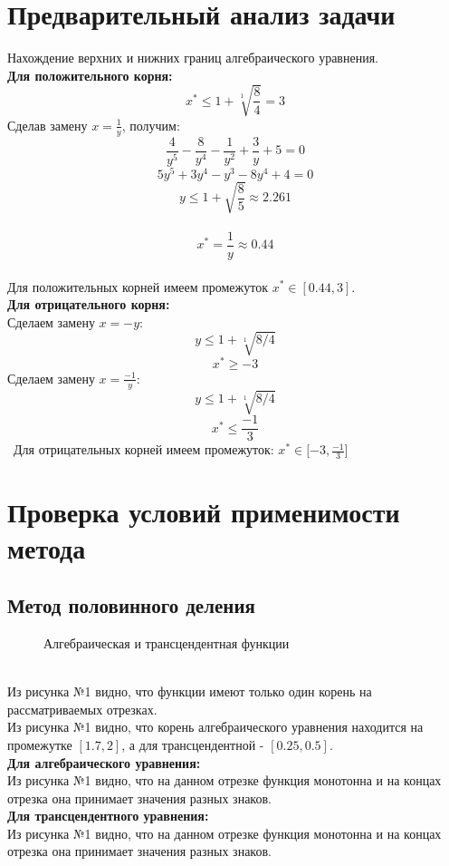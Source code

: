 \documentclass[12pt]{article}
\begin{document}
\section{Предварительный анализ задачи}
Нахождение верхних и нижних границ алгебраического уравнения.\\
\textbf{Для положительного корня:}\\
\[x^* \leq 1+\sqrt[1]{\frac{8}{4}} = 3\]
Сделав замену $x=\frac{1}{y}$, получим:\[\frac{4}{y^5}-\frac{8}{y^4}-\frac{1}{y^2}+\frac{3}{y}+5 = 0 \]
\[ 5y^5+3y^4-y^3-8y^4+4=0\]
\[y\leq 1+\sqrt{\frac{8}{5}} \approx 2.261\]\\
\[x^{*} = \frac{1}{y} \approx 0.44 \]\\
Для положительных корней имеем промежуток $x^{*} \in[0.44,3]$.\\
\textbf{Для отрицательного корня:}\\
Сделаем замену $x =-y$:\\
\[ y \le 1+\sqrt[1]{8/4}\]
\[ x^* \ge -3 \]
Сделаем замену $x = \frac{-1}{y}$:
\[ y \le 1+\sqrt[1]{8/4}\]
\[x^* \le \frac{-1}{3}\]\
Для отрицательных корней имеем промежуток: $x^*\in[-3,\frac{-1}{3}$]
\section{Проверка условий применимости метода}
\subsection{Метод половинного деления}
\begin{figure}[h!]
\caption{Алгебраическая и трансцендентная функции}
\end{figure}\\
Из рисунка №1 видно, что функции имеют только один корень на рассматриваемых отрезках.\\
Из рисунка №1 видно, что корень алгебраического уравнения находится на промежутке $[1.7,2]$, а для трансцендентной - $[0.25,0.5]$.\\
\textbf{Для алгебраического уравнения:}\\
Из рисунка №1 видно, что на данном отрезке функция монотонна и на концах отрезка она принимает значения разных знаков.\\
\textbf{Для трансцендентного уравнения:}\\
Из рисунка №1 видно, что на данном отрезке функция монотонна и на концах отрезка она принимает значения разных знаков.\\
\end{document}
